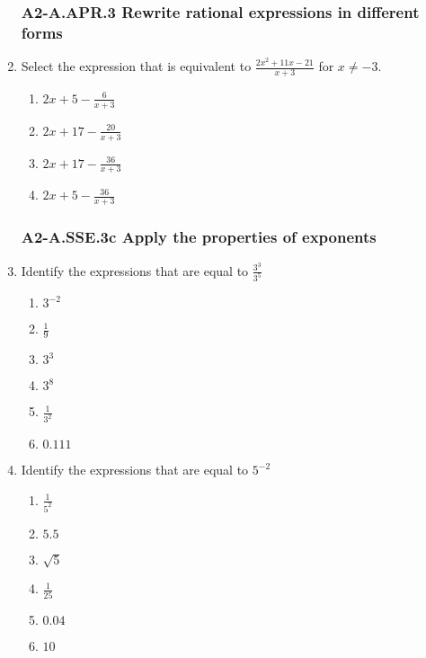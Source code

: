 \documentclass[12pt, twoside]{article}
\begin{document}
\begin{enumerate}[itemsep=0.5cm]
\subsubsection*{A2-A.APR.3 Rewrite rational expressions in different forms}
\item Select the expression that is equivalent to $\displaystyle \frac{2x^2 + 11x - 21}{x+3}$ for $x \neq -3$.
    \begin{enumerate}
        \item $\displaystyle 2x + 5 - \frac{6}{x + 3}$
        \item $\displaystyle 2x + 17 - \frac{20}{x + 3}$
        \item $\displaystyle 2x + 17 - \frac{36}{x + 3}$
        \item $\displaystyle 2x + 5 - \frac{36}{x + 3}$
    \end{enumerate} \vspace{3cm}

\newpage
\subsubsection*{A2-A.SSE.3c Apply the properties of exponents}
\item Identify the expressions that are equal to $\displaystyle \frac{3^3}{3^5}$
    \begin{multicols}{2}
    \begin{enumerate}
        \item $3^{-2}$
        \item $\frac{1}{9}$
        \item $3^{3}$
        \item $3^8$
        \item $\displaystyle \frac{1}{3^2}$        
        \item $0.111$
    \end{enumerate}
    \end{multicols}

\item Identify the expressions that are equal to $\displaystyle 5^{-2}$
    \begin{multicols}{2}
    \begin{enumerate}
        \item $\displaystyle \frac{1}{5^2}$
        \item $5.5$
        \item $\sqrt{5}$        
        \item $\displaystyle \frac{1}{25}$
        \item $0.04$        
        \item $10$
    \end{enumerate}
    \end{multicols}


\end{enumerate}
\end{document}
